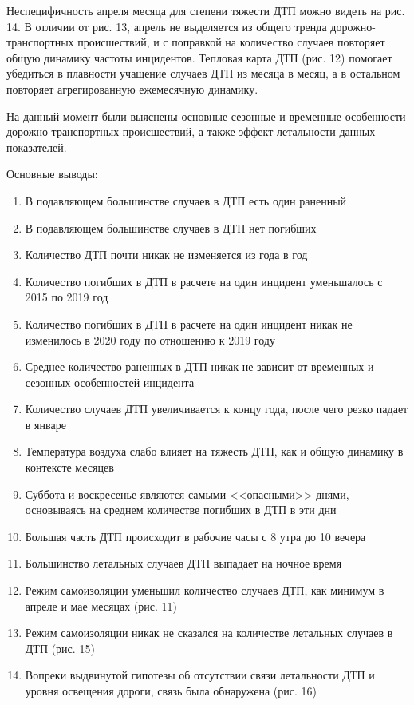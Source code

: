 \documentclass[a4paper, 14pt]{article}
\begin{document}
Неспецифичность апреля месяца для степени тяжести ДТП можно видеть на рис. 14. В отличии от рис. 13, апрель не выделяется из общего тренда дорожно-транспортных происшествий, и с поправкой на количество случаев повторяет общую динамику частоты инцидентов. Тепловая карта ДТП (рис. 12) помогает убедиться в плавности учащение случаев ДТП из месяца в месяц, а в остальном повторяет агрегированную ежемесячную динамику.

На данный момент были выяснены основные сезонные и временные особенности дорожно-транспортных происшествий, а также эффект летальности данных показателей.  

\newpage
\noindent Основные выводы:
\begin{enumerate}
	\item В подавляющем большинстве случаев в ДТП есть один раненный 
	\item В подавляющем большинстве случаев в ДТП нет погибших
	\item Количество ДТП почти никак не изменяется из года в год
	\item Количество погибших в ДТП в расчете на один инцидент уменьшалось с 2015 по 2019 год
	\item Количество погибших в ДТП в расчете на один инцидент никак не изменилось в 2020 году по отношению к 2019 году
	\item Среднее количество раненных в ДТП никак не зависит от временных и сезонных особенностей инцидента 
	\item Количество случаев ДТП увеличивается к концу года, после чего резко падает в январе
	\item Температура воздуха слабо влияет на тяжесть ДТП, как и общую динамику в контексте месяцев
	\item Суббота и воскресенье являются самыми <<опасными>> днями, основываясь на среднем количестве погибших в ДТП в эти дни
	\item Большая часть ДТП происходит в рабочие часы с 8 утра до 10 вечера
	\item Большинство летальных случаев ДТП выпадает на ночное время 
	\item Режим самоизоляции уменьшил количество случаев ДТП, как минимум в апреле и мае месяцах (рис. 11)
	\item Режим самоизоляции никак не сказался на количестве летальных случаев в ДТП (рис. 15)
	\item Вопреки выдвинутой гипотезы об отсутствии связи летальности ДТП и уровня освещения дороги, связь была обнаружена (рис. 16)
	
\end{enumerate}
\end{document}
